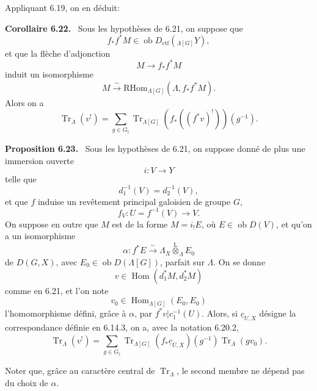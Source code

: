 \documentclass[11pt]{article}
\newenvironment{statement}[1]{\par\medskip\noindent\textbf{#1.}\ }{\par\medskip}
\DeclareMathOperator{\Hom}{Hom}
\providecommand{\RHom}{\mathrm{RHom}}
\providecommand{\Tr}{\operatorname{Tr}}
\providecommand{\Tr}{\operatorname{Tr}}
\providecommand{\lten}{\overset{\mathrm L}{\otimes}}
\providecommand{\Ob}{\operatorname{ob}}
\providecommand{\Tr}{\operatorname{Tr}}
\providecommand{\RHom}{\mathrm{RHom}}
\providecommand{\Hom}{\operatorname{Hom}}
\providecommand{\lten}{\overset{\mathrm L}{\otimes}}
\providecommand{\RHom}{\mathrm R\mathcal{H}om}
\providecommand{\lten}{\overset{\mathrm L}{\otimes}}
\providecommand{\Ob}{\operatorname{ob}}
\providecommand{\Tr}{\operatorname{Tr}}
\providecommand{\lten}{\overset{\mathrm L}{\otimes}}
\providecommand{\lten}{\overset{\mathrm L}{\otimes}}
\providecommand{\Ob}{\operatorname{Ob}}
\providecommand{\lten}{\overset{\mathrm L}{\otimes}}
\providecommand{\RHom}{\mathrm{RHom}}
\providecommand{\Hom}{\operatorname{Hom}}
\providecommand{\Tr}{\operatorname{Tr}}
\providecommand{\Ob}{\operatorname{ob}}
\providecommand{\Ob}{\operatorname{Ob}}
\providecommand{\lten}{\overset{\mathrm L}{\otimes}}
\begin{document}
Appliquant 6.19, on en déduit:

\begin{statement}{Corollaire 6.22}
Sous les hypothèses de 6.21, on suppose que
\[
f_*f^*M\in\Ob D_{\mathrm{ctf}}({}_{\Lambda[G]}Y),
\]
et que la flèche d'adjonction
\[
M\to f_*f^*M
\]
induit un isomorphisme
\[
M\xrightarrow{\sim}\RHom_{\Lambda[G]}(\Lambda,f_*f^*M).
\]
Alors on a
\begin{equation}
\Tr_{\Lambda}(v^!)=
\sum_{g\in G_{\natural}}\Tr_{\Lambda[G]}(f_*((f^*v)^!))(g^{-1}).
\tag{6.22.1}
\end{equation}
\end{statement}

\begin{statement}{Proposition 6.23}
Sous les hypothèses de 6.21, on suppose donné de plus une immersion ouverte
\[
i:V\to Y
\]
telle que
\[
d_1^{-1}(V)=d_2^{-1}(V),
\]
et que $f$ induise un revêtement principal galoisien de groupe $G$,
\[
f_V:U=f^{-1}(V)\to V.
\]
On suppose en outre que $M$ est de la forme $M=i_!E$, où $E\in\Ob D(V)$, et qu'on a un isomorphisme
\[
\alpha:f^*E\xrightarrow{\sim}\Lambda_X\lten_{\Lambda}E_0
\]
de $D(G,X)$, avec $E_0\in\Ob D(\Lambda[G])$, parfait sur $\Lambda$. On se donne
\[
v\in\Hom(d_1^*M,d_2^*M)
\]
comme en 6.21, et l'on note
\[
v_0\in\Hom_{\Lambda[G]}(E_0,E_0)
\]
l'homomorphisme défini, grâce à $\alpha$, par $f^*v|c_1^{-1}(U)$. Alors, si $\underline c_{U,X}$ désigne la correspondance définie en 6.14.3, on a, avec la notation 6.20.2,
\begin{equation}
\Tr_{\Lambda}(v^!)
=
\sum_{g\in G_{\natural}}
\Tr_{\Lambda[G]}(f_*\underline c_{U,X})(g^{-1})\Tr_{\Lambda}(gv_0).
\tag{6.23.1}
\end{equation}
\end{statement}

Noter que, grâce au caractère central de $\Tr_{\Lambda}$, le second membre ne dépend pas du choix de $\alpha$.
\end{document}
